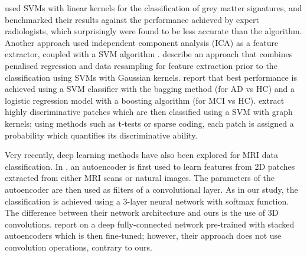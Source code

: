 \documentclass[a4paper,10pt]{article}
\begin{document}
\cite{kloppel} used SVMs with linear kernels for the classification of grey matter signatures, and benchmarked their results against the performance achieved by expert radiologists, which surprisingly were found to be less accurate than the algorithm. Another approach used independent component analysis (ICA) as a feature extractor, coupled with a SVM algorithm \cite{ica}. \cite{montana} describe an approach that combines penalised regression and data resampling for feature extraction prior to the classification using SVMs with Gaussian kernels. \cite{batmanghelich} report that best performance is achieved using a SVM classifier with the bagging method (for AD vs HC) and a logistic regression model with a boosting algorithm (for MCI vs HC). \cite{instance} extract highly discriminative patches which are then classified using a SVM with graph kernels; using methods such as t-tests or sparse coding, each patch is assigned a probability which quantifies its discriminative ability.

Very recently, deep learning methods have also been explored for MRI data classification. In \cite{gupta}, an autoencoder is first used to learn features from 2D patches extracted from either MRI scans or natural images. The parameters of the autoencoder are then used as filters of a convolutional layer. As in our study, the classification is achieved using a 3-layer neural network with softmax function. The difference between their network architecture and ours is the use of 3D convolutions. \cite{sydney} report on a deep fully-connected network pre-trained with stacked autoencoders which is then fine-tuned; however, their approach does not use convolution operations, contrary to ours.
\end{document}
